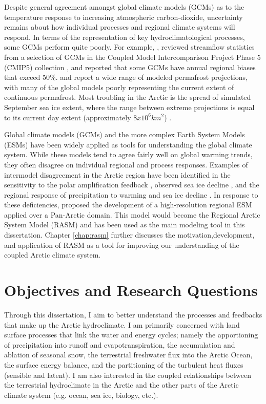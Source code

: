 Despite general agreement amongst global climate models (GCMs) as to the temperature response to increasing atmospheric carbon-dioxide, uncertainty remains about how individual processes and regional climate systems will respond.
In terms of the representation of key hydroclimatological processes, some GCMs perform quite poorly.
For example, \citet{Alkama_2013}, reviewed streamflow statistics from a selection of GCMs in the Coupled Model Intercomparison Project Phase 5 (CMIP5) collection \citet{Taylor_2012}, and reported that some GCMs have annual regional biases that exceed 50\%.
\citet{Slater_2013} and \citet{Koven_2013} report a wide range of modeled permafrost projections, with many of the global models poorly representing the current extent of continuous permafrost.
Most troubling in the Arctic is the spread of simulated September sea ice extent, where the range between extreme projections is equal to its current day extent (approximately $8x10^6 km^2$) \citep[e.g.][]{Maslowski_2012}.

Global climate models (GCMs) and the more complex Earth System Models (ESMs) have been widely applied as tools for understanding the global climate system.
While these models tend to agree fairly well on global warming trends, they often disagree on individual regional and process responses.
Examples of intermodel disagreement in the Arctic region have been identified in the sensitivity to the polar amplification feedback \citep{Serreze_2006b,Holland_2003}, observed sea ice decline \citep{Stroeve_2007,Zhang_2010}, and the regional response of precipitation to warming and sea ice decline \citep{Bintanja_2014}.
In response to these deficiencies, \citet{Roberts_2010} proposed the development of a high-resolution regional ESM applied over a Pan-Arctic domain.
This model would become the Regional Arctic System Model (RASM) and has been used as the main modeling tool in this dissertation.
Chapter \ref{chap:rasm} further discusses the motivation,development, and application of RASM as a tool for improving our understanding of the coupled Arctic climate system.

\section{Objectives and Research Questions}

Through this dissertation, I aim to better understand the processes and feedbacks that make up the Arctic hydroclimate.
I am primarily concerned with land surface processes that link the water and energy cycles; namely the apportioning of precipitation into runoff and evapotranspiration, the accumulation and ablation of seasonal snow, the terrestrial freshwater flux into the Arctic Ocean, the surface energy balance, and the partitioning of the turbulent heat fluxes (sensible and latent).
I am also interested in the coupled relationships between the terrestrial hydroclimate in the Arctic and the other parts of the Arctic climate system (e.g. ocean, sea ice, biology, etc.).

